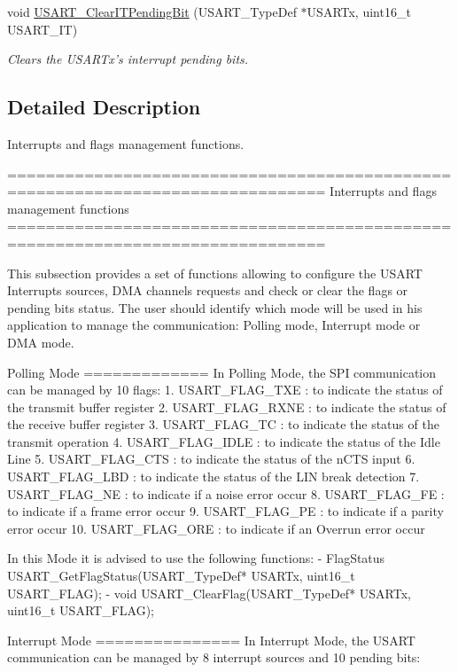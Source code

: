 \begin{DoxyCompactItemize}
void \hyperlink{group___u_s_a_r_t___group9_ga1fc25d0338695063be5e50156955d9bc}{U\-S\-A\-R\-T\-\_\-\-Clear\-I\-T\-Pending\-Bit} (U\-S\-A\-R\-T\-\_\-\-Type\-Def $\ast$U\-S\-A\-R\-Tx, uint16\-\_\-t U\-S\-A\-R\-T\-\_\-\-I\-T)
\begin{DoxyCompactList}\small\item\em Clears the U\-S\-A\-R\-Tx's interrupt pending bits. \end{DoxyCompactList}\end{DoxyCompactItemize}


\subsection{Detailed Description}
Interrupts and flags management functions. \begin{DoxyVerb} ===============================================================================
                   Interrupts and flags management functions
 ===============================================================================  

  This subsection provides a set of functions allowing to configure the USART 
  Interrupts sources, DMA channels requests and check or clear the flags or 
  pending bits status.
  The user should identify which mode will be used in his application to manage 
  the communication: Polling mode, Interrupt mode or DMA mode. 
    
  Polling Mode
  =============
  In Polling Mode, the SPI communication can be managed by 10 flags:
     1. USART_FLAG_TXE : to indicate the status of the transmit buffer register
     2. USART_FLAG_RXNE : to indicate the status of the receive buffer register
     3. USART_FLAG_TC : to indicate the status of the transmit operation
     4. USART_FLAG_IDLE : to indicate the status of the Idle Line             
     5. USART_FLAG_CTS : to indicate the status of the nCTS input
     6. USART_FLAG_LBD : to indicate the status of the LIN break detection
     7. USART_FLAG_NE : to indicate if a noise error occur
     8. USART_FLAG_FE : to indicate if a frame error occur
     9. USART_FLAG_PE : to indicate if a parity error occur
     10. USART_FLAG_ORE : to indicate if an Overrun error occur

  In this Mode it is advised to use the following functions:
      - FlagStatus USART_GetFlagStatus(USART_TypeDef* USARTx, uint16_t USART_FLAG);
      - void USART_ClearFlag(USART_TypeDef* USARTx, uint16_t USART_FLAG);

  Interrupt Mode
  ===============
  In Interrupt Mode, the USART communication can be managed by 8 interrupt sources
  and 10 pending bits: 


\end{DoxyVerb}
